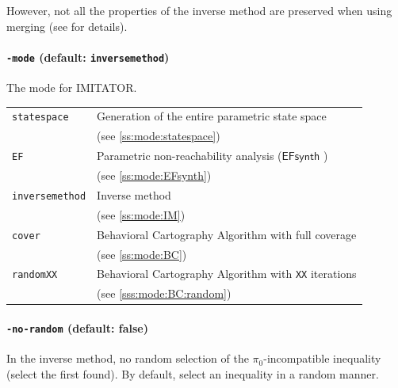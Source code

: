 \documentclass[a4paper,11pt]{report}
\newcommand{\pio}{\pi_0}
\newcommand{\EFsynth}{\ensuremath{\mathsf{EFsynth}}}
\newcommand{\imitator}{\textsf{IMITATOR}}
\newcommand{\styleOption}[1]{\textcolor{optioncolor}{\texttt{#1}}}
\begin{document}
However, not all the properties of the inverse method are preserved when using merging (see \cite{AFS13atva} for details).



\paragraph{\styleOption{-mode} (default: \styleOption{inversemethod})}
The mode for \imitator{}.

\begin{tabular}{@{} l @{\ \ } l}
	\styleOption{statespace} & Generation of the entire parametric state space \\
	& (see \cref{ss:mode:statespace}) \\
	
	\styleOption{EF} & Parametric non-reachability analysis (\EFsynth{} \cite{JLR15}) \\
	& (see \cref{ss:mode:EFsynth}) \\
	
	\styleOption{inversemethod} & Inverse method \\
	& (see \cref{ss:mode:IM}) \\
	
	\styleOption{cover} & Behavioral Cartography Algorithm with full coverage \\
	& (see \cref{ss:mode:BC}) \\
	
	\styleOption{randomXX} & Behavioral Cartography Algorithm with \styleOption{XX} iterations \\
	& (see \cref{sss:mode:BC:random}) \\
\end{tabular}



\paragraph{\styleOption{-no-random} (default: false)}
In the inverse method, no random selection of the $\pio$-incompatible inequality (select the first found).
By default, select an inequality in a random manner.



\end{document}
